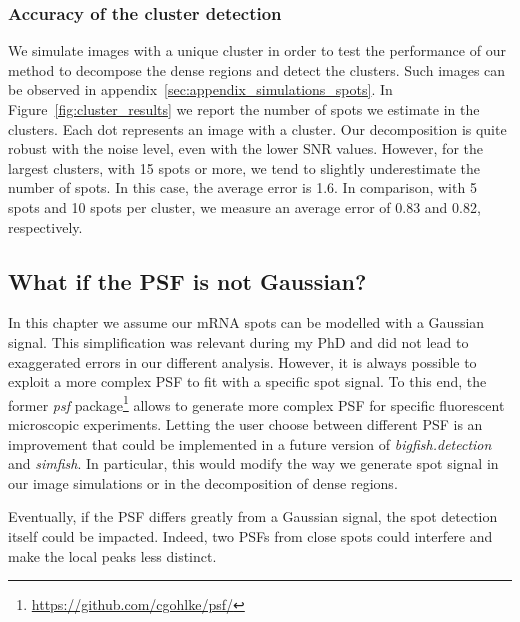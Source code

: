 \subsubsection{Accuracy of the cluster detection}

We simulate images with a unique cluster in order to test the performance of our method to decompose the dense regions and detect the clusters.
Such images can be observed in appendix~\ref{sec:appendix_simulations_spots}.
In Figure~\ref{fig:cluster_results} we report the number of spots we estimate in the clusters.
Each dot represents an image with a cluster.
Our decomposition is quite robust with the noise level, even with the lower \ac{SNR} values.
However, for the largest clusters, with 15 spots or more, we tend to slightly underestimate the number of spots.
In this case, the average error is 1.6.
In comparison, with 5 spots and 10 spots per cluster, we measure an average error of 0.83 and 0.82, respectively.

\subsection{What if the PSF is not Gaussian?}
\label{subsec:psf}

In this chapter we assume our \ac{mRNA} spots can be modelled with a Gaussian signal.
This simplification was relevant during my PhD and did not lead to exaggerated errors in our different analysis.
However, it is always possible to exploit a more complex \ac{PSF} to fit with a specific spot signal.
To this end, the former \emph{psf} package\footnote{\url{https://github.com/cgohlke/psf/}} allows to generate more complex \ac{PSF} for specific fluorescent microscopic experiments.
Letting the user choose between different \ac{PSF} is an improvement that could be implemented in a future version of \emph{bigfish.detection} and \emph{simfish}.
In particular, this would modify the way we generate spot signal in our image simulations or in the decomposition of dense regions.

Eventually, if the \ac{PSF} differs greatly from a Gaussian signal, the spot detection itself could be impacted.
Indeed, two \ac{PSF}s from close spots could interfere and make the local peaks less distinct.

